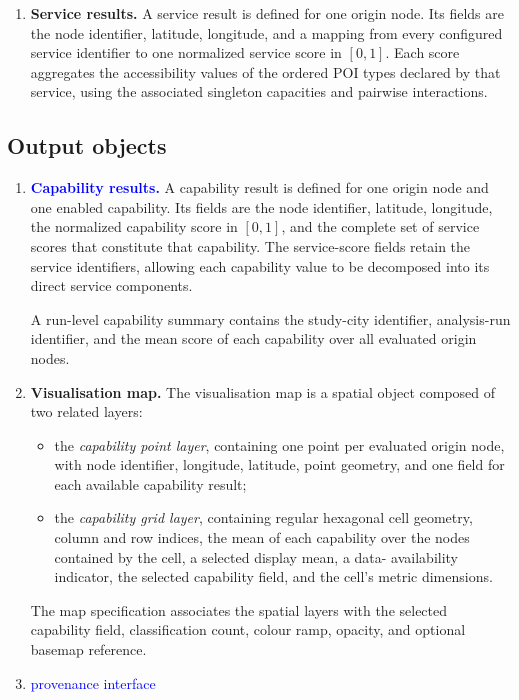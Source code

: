 \begin{enumerate}
    \item \textbf{Service results.}
    A service result is defined for one origin node. Its fields are the node
    identifier, latitude, longitude, and a mapping from every configured service
    identifier to one normalized service score in \([0,1]\). Each score
    aggregates the accessibility values of the ordered POI types declared by
    that service, using the associated singleton capacities and pairwise
    interactions.
\end{enumerate}

\subsection*{Output objects}
\begin{enumerate}
    \item \textcolor{blue}{\textbf{Capability results.}}
    A capability result is defined for one origin node and one enabled
    capability. Its fields are the node identifier, latitude, longitude, the
    normalized capability score in \([0,1]\), and the complete set of service
    scores that constitute that capability. The service-score fields retain the
    service identifiers, allowing each capability value to be decomposed into
    its direct service components.

    A run-level capability summary contains the study-city identifier,
    analysis-run identifier, and the mean score of each capability over all
    evaluated origin nodes.

    \item \textbf{Visualisation map.}
    The visualisation map is a spatial object composed of two related layers:
    \begin{itemize}
        \item the \emph{capability point layer}, containing one point per
        evaluated origin node, with node identifier, longitude, latitude, point
        geometry, and one field for each available capability result;
        \item the \emph{capability grid layer}, containing regular hexagonal
        cell geometry, column and row indices, the mean of each capability over
        the nodes contained by the cell, a selected display mean, a data-
        availability indicator, the selected capability field, and the cell's
        metric dimensions.
    \end{itemize}
    The map specification associates the spatial layers with the selected
    capability field, classification count, colour ramp, opacity, and optional
    basemap reference.

    \item \textcolor{blue}{provenance interface}
\end{enumerate}
